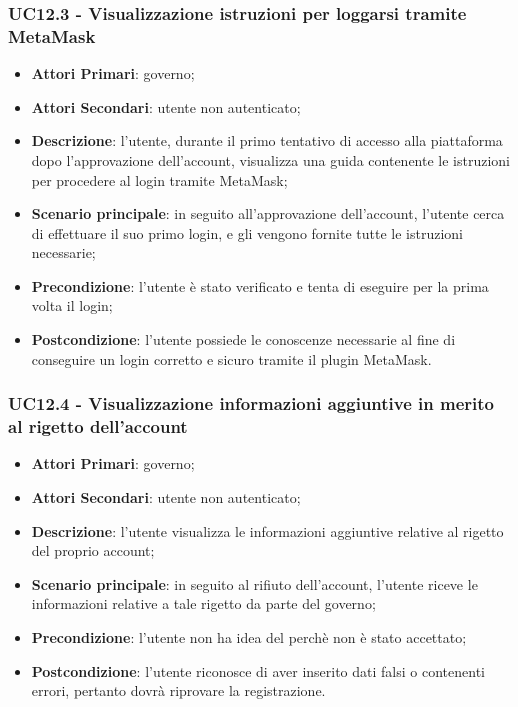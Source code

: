 \subsubsection{UC12.3 - Visualizzazione istruzioni per loggarsi tramite MetaMask\glosp}
\begin{itemize}
	\item \textbf{Attori Primari}:
	governo;
	\item \textbf{Attori Secondari}:
	utente non autenticato;
	\item \textbf{Descrizione}: l'utente, durante il primo tentativo di accesso alla piattaforma dopo l'approvazione dell'account, visualizza una guida contenente le istruzioni per procedere al login tramite MetaMask\glo;
	\item \textbf{Scenario principale}: in seguito all'approvazione dell'account, l'utente cerca di effettuare il suo primo login, e gli vengono fornite tutte le istruzioni necessarie;
	\item \textbf{Precondizione}: l'utente è stato verificato e tenta di eseguire per la prima volta il login;
	\item \textbf{Postcondizione}: l'utente possiede le conoscenze necessarie al fine di conseguire un login corretto e sicuro tramite il plugin MetaMask\glo.
\end{itemize}
\subsubsection{UC12.4 - Visualizzazione informazioni aggiuntive in merito al rigetto dell'account}
\begin{itemize}
	\item \textbf{Attori Primari}:
	governo;
	\item \textbf{Attori Secondari}:
	utente non autenticato;
	\item \textbf{Descrizione}: l'utente visualizza le informazioni aggiuntive relative al rigetto del proprio account;
	\item \textbf{Scenario principale}: in seguito al rifiuto dell'account, l'utente riceve le informazioni relative a tale rigetto da parte del governo;
	\item \textbf{Precondizione}: l'utente non ha idea del perchè non è stato accettato;
	\item \textbf{Postcondizione}: l'utente riconosce di aver inserito dati falsi o contenenti errori, pertanto dovrà riprovare la registrazione.
\end{itemize} 
